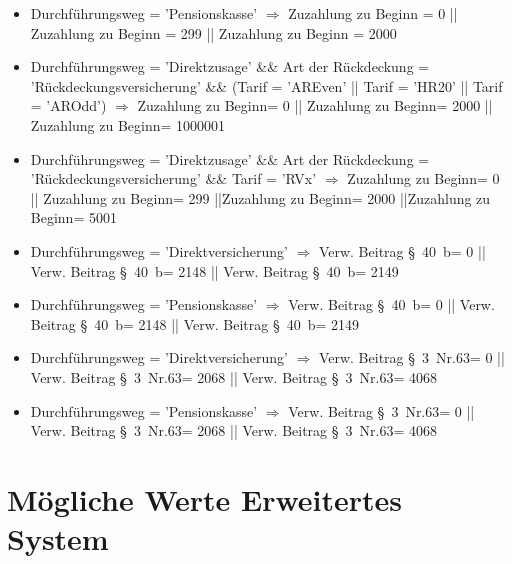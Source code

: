\begin{itemize}
\item Durchführungsweg = 'Pensionskasse' $\Rightarrow$ Zuzahlung zu Beginn = 0 || Zuzahlung zu Beginn = 299 || Zuzahlung zu Beginn = 2000
\item Durchführungsweg = 'Direktzusage' \&\& Art der Rückdeckung = 'Rückdeckungsversicherung' \&\& (Tarif = 'AREven' || Tarif = 'HR20' || Tarif = 'AROdd') $\Rightarrow$ Zuzahlung zu Beginn= 0 || Zuzahlung zu Beginn= 2000 || Zuzahlung zu Beginn= 1000001
\item Durchführungsweg = 'Direktzusage' \&\& Art der Rückdeckung = 'Rückdeckungsversicherung' \&\& Tarif = 'RVx' $\Rightarrow$ Zuzahlung zu Beginn= 0 || Zuzahlung zu Beginn= 299 ||Zuzahlung zu Beginn= 2000 ||Zuzahlung zu Beginn= 5001
\item Durchführungsweg = 'Direktversicherung' $\Rightarrow$ Verw. Beitrag §~40~b= 0 || Verw. Beitrag §~40~b= 2148 || Verw. Beitrag §~40~b= 2149
\item Durchführungsweg = 'Pensionskasse' $\Rightarrow$ Verw. Beitrag §~40~b= 0 || Verw. Beitrag §~40~b= 2148 || Verw. Beitrag §~40~b= 2149
\item Durchführungsweg = 'Direktversicherung' $\Rightarrow$ Verw. Beitrag §~3~Nr.63= 0 || Verw. Beitrag §~3~Nr.63= 2068 || Verw. Beitrag §~3~Nr.63= 4068
\item Durchführungsweg = 'Pensionskasse' $\Rightarrow$ Verw. Beitrag §~3~Nr.63= 0 || Verw. Beitrag §~3~Nr.63= 2068 || Verw. Beitrag §~3~Nr.63= 4068
\end{itemize}

\normalsize

\section{Mögliche Werte Erweitertes System}\label{sec:äquivalenklassenComplex}

